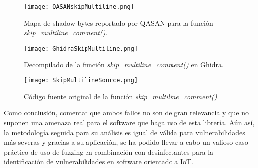 \begin{itemize}
    \begin{figure}[H]
        \centering
        \texttt{[image: QASANskipMultiline.png]}
        \caption{Mapa de shadow-bytes reportado por QASAN para la función \textit{skip\_multiline\_comment()}.}
        \label{fig:QASANskipMultiline}
    \end{figure}

    \begin{figure}[H]
        \centering
        \texttt{[image: GhidraSkipMultiline.png]}
        \caption{Decompilado de la función \textit{skip\_multiline\_comment()} en Ghidra.}
        \label{fig:GhidraSkipMultiline}
    \end{figure}

    \begin{figure}[H]
        \centering
        \texttt{[image: SkipMultilineSource.png]}
        \caption{Código fuente original de la función \textit{skip\_multiline\_comment()}.}
        \label{fig:SkipMultilineSource}
    \end{figure}
\end{itemize}

Como conclusión, comentar que ambos fallos no son de gran relevancia y que no suponen una amenaza real para el software que haga uso de esta librería.
Aún así, la metodología seguida para su análisis es igual de válida para vulnerabilidades más severas y gracias a su aplicación, se ha podido 
llevar a cabo un valioso caso práctico de uso de fuzzing en combinación con desinfectantes para la identificación de vulnerabilidades en software orientado 
a IoT.
